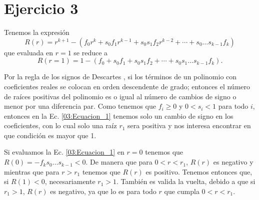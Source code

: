 \section*{Ejercicio 3}
\graphicspath{{Figuras/ej_03/}}

Tenemos la expresión
\begin{equation}
    R(r) = r^{k+1} - (f_0 r^k +  s_0 f_1 r^{k-1} + s_0 s_1 f_2 r^{k-2} + \cdots + s_0 \dots s_{k-1} f_k)
    \label{03:Ecuacion_1}
\end{equation}
que evaluada en $r=1$ se reduce a
\begin{equation}
    R(r=1) = 1 - (f_0 + s_0 f_1 + s_0 s_1 f_2+ \cdots + s_0 s_1 \dots s_{k-1}  f_k).
\end{equation}

Por la regla de los signos de Descartes \cite{Descartes}, si los términos de un polinomio con coeficientes reales se colocan en orden descendente de grado; entonces el número de raíces positivas del polinomio es o igual al número de cambios de signo o menor por una diferencia par. Como tenemos que $f_i \geq 0$ y $0<s_{i}<1$ para todo $i$, entonces en la Ec. \ref{03:Ecuacion_1} tenemos solo un cambio de signo en los coeficientes, con lo cual solo una raíz $r_1$ sera positiva y nos interesa encontrar en que condición es mayor que 1.

Si evaluamos la Ec. \ref{03:Ecuacion_1} en $r=0$ tenemos que $R(0) = - f_{k} s_0 \dots s_{k-1} < 0$. De manera que para $0<r<r_1$, $R(r)$ es negativo y mientras que para $r>r_1$ tenemos que $R(r)$ es positivo. Tenemos entonces que, si $R(1)<0$, necesariamente $r_1 > 1$. También es valida la vuelta, debido a que si $r_1 > 1$, $R(r)$ es negativo, ya que lo es para todo $r$ que cumpla $0<r<r_1$.